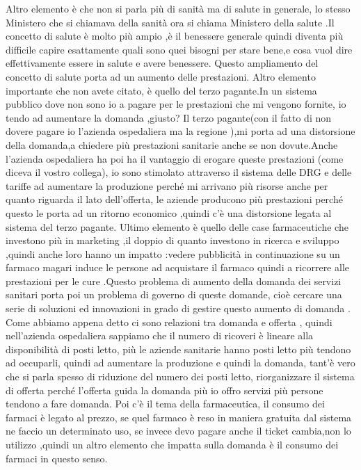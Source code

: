 \documentclass[]{article}
\begin{document}
Altro elemento è che non si parla più di sanità ma di salute in
generale, lo stesso Ministero che si chiamava della sanità ora si chiama
Ministero della salute .Il concetto di salute è molto più ampio ,è il
benessere generale quindi diventa più difficile capire esattamente quali
sono quei bisogni per stare bene,e cosa vuol dire effettivamente essere
in salute e avere benessere. Questo ampliamento del concetto di salute
porta ad un aumento delle prestazioni. Altro elemento importante che non
avete citato, è quello del terzo pagante.In un sistema pubblico dove non
sono io a pagare per le prestazioni che mi vengono fornite, io tendo ad
aumentare la domanda ,giusto? Il terzo pagante(con il fatto di non
dovere pagare io l'azienda ospedaliera ma la regione ),mi porta ad una
distorsione della domanda,a chiedere più prestazioni sanitarie anche se
non dovute.Anche l'azienda ospedaliera ha poi ha il vantaggio di erogare
queste prestazioni (come diceva il vostro collega), io sono stimolato
attraverso il sistema delle DRG e delle tariffe ad aumentare la
produzione perché mi arrivano più risorse anche per quanto riguarda il
lato dell'offerta, le aziende producono più prestazioni perché questo le
porta ad un ritorno economico ,quindi c'è una distorsione legata al
sistema del terzo pagante. Ultimo elemento è quello delle case
farmaceutiche che investono più in marketing ,il doppio di quanto
investono in ricerca e sviluppo ,quindi anche loro hanno un impatto
:vedere pubblicità in continuazione su un farmaco magari induce le
persone ad acquistare il farmaco quindi a ricorrere alle prestazioni per
le cure .Questo problema di aumento della domanda dei servizi sanitari
porta poi un problema di governo di queste domande, cioè cercare una
serie di soluzioni ed innovazioni in grado di gestire questo aumento di
domanda . Come abbiamo appena detto ci sono relazioni tra domanda e
offerta , quindi nell'azienda ospedaliera sappiamo che il numero di
ricoveri è lineare alla disponibilità di posti letto, più le aziende
sanitarie hanno posti letto più tendono ad occuparli, quindi ad
aumentare la produzione e quindi la domanda, tant'è vero che si parla
spesso di riduzione del numero dei posti letto, riorganizzare il sistema
di offerta perché l'offerta guida la domanda più io offro servizi più
persone tendono a fare domanda. Poi c'è il tema della farmaceutica, il
consumo dei farmaci è legato al prezzo, se quel farmaco è reso in
maniera gratuita dal sistema ne faccio un determinato uso, se invece
devo pagare anche il ticket cambia,non lo utilizzo ,quindi un altro
elemento che impatta sulla domanda è il consumo dei farmaci in questo
senso.
\end{document}
